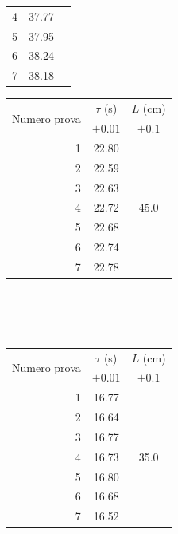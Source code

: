 \documentclass{article}
\begin{document}
\begin{table}[h!]
\begin{minipage}{0.1\textwidth}
\begin{tabular}{ | r | c | c | }
    				4 & 37.77 & \\ \cline{1-2}
    				5 & 37.95 & \\ \cline{1-2}
    				6 & 38.24 & \\ \cline{1-2}
    				7 & 38.18 & \\ \cline{1-2}
    				\hline
			\end{tabular}
	\end{minipage}
	\hspace{0.3\textwidth}
	\begin{minipage}{0.1\textwidth}
			\begin{tabular}{ | r | c | c | }
    				\hline
    				\multirow{2}{5em}{Numero prova} & $\tau$ (s) & $L$ (cm) \\
    				& $\pm 0.01$ & $\pm 0.1$ \\
    				\hline
    				1 & 22.80 & \multirow{7}{*}{45.0} \\ \cline{1-2}
    				2 & 22.59 & \\ \cline{1-2}
    				3 & 22.63 & \\ \cline{1-2}
    				4 & 22.72 & \\ \cline{1-2}
    				5 & 22.68 & \\ \cline{1-2}
    				6 & 22.74 & \\ \cline{1-2}
    				7 & 22.78 & \\ \cline{1-2}
    				\hline
			\end{tabular}
	\end{minipage} \\ \\ \\
	\begin{minipage}{0.1\textwidth}
		\hspace{-0.05\textwidth}
		\begin{tabular}{ | r | c | c | }
			\hline
			\multirow{2}{5em}{Numero prova} & $\tau$ (s) & $L$ (cm) \\
			& $\pm 0.01$ & $\pm 0.1$ \\
			\hline
			1 & 16.77 & \multirow{7}{*}{35.0} \\ \cline{1-2}
			2 & 16.64 & \\ \cline{1-2}
			3 & 16.77 & \\ \cline{1-2}
			4 & 16.73 & \\ \cline{1-2}
			5 & 16.80 & \\ \cline{1-2}
			6 & 16.68 & \\ \cline{1-2}
			7 & 16.52 & \\ \hline
		\end{tabular}
		
	\end{minipage}
\end{table}
\end{document}
